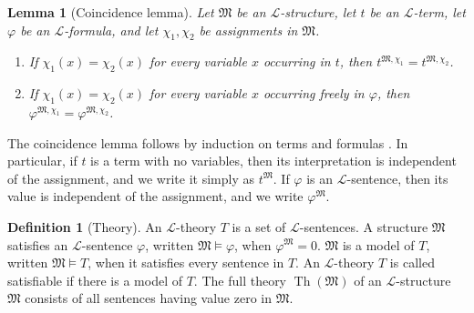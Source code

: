 \documentclass{amsart}
\newtheorem{lemma}[theorem]{Lemma}
\theoremstyle{definition}
\newtheorem{definition}{Definition}[section]
\theoremstyle{remark}
\numberwithin{equation}{section}
\begin{document}
	\begin{lemma}[Coincidence lemma]
		\label{lem: coincidence}
		Let $\mathfrak M$ be an $\mathcal L$-structure, let $t$ be an $\mathcal L$-term, let $\varphi$ be an $\mathcal L$-formula, and let $\chi_1,\chi_2$ be assignments in $\mathfrak M$.
		
		\begin{enumerate}
			\item If $\chi_1(x)=\chi_2(x)$ for every variable $x$ occurring in $t$, then
			$t^{\mathfrak M,\chi_1}
			=
			t^{\mathfrak M,\chi_2}$.
			
			\item If $\chi_1(x)=\chi_2(x)$ for every variable $x$ occurring freely in $\varphi$, then
			$\varphi^{\mathfrak M,\chi_1}
			=
			\varphi^{\mathfrak M,\chi_2}$.
		\end{enumerate}
	\end{lemma}
	The coincidence lemma follows by induction on terms and formulas \cite[Section 1.4]{ChangandKeisler2013modeltheory}. In particular, if $t$ is a term with no variables, then its interpretation is independent of the assignment, and we write it simply as $t^{\mathfrak M}.$ If $\varphi$ is an $\mathcal L$-sentence, then its value is independent of the assignment, and we write $\varphi^{\mathfrak M}.$ %
	
	\begin{definition}[Theory] An $\mathcal L$-theory $T$ is a set of $\mathcal L$-sentences. A structure $\mathfrak M$ satisfies an $\mathcal L$-sentence $\varphi$, written $\mathfrak M\models \varphi$, when $\varphi^{\mathfrak M} = 0$. $\mathfrak M$ is a model of $T$, written $\mathfrak M \models T$, when it satisfies every sentence in $T$. An $\mathcal L$-theory $T$ is called satisfiable if there is a model of $T$. The full theory $\operatorname{Th}(\mathfrak M)$ of an $\mathcal L$-structure $\mathfrak M$ consists of all sentences having value zero in $\mathfrak M$.
	\end{definition}
	
\end{document}
